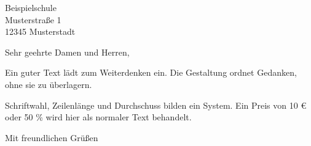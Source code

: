 \documentclass[12pt,a4paper,ngerman,DIV=12,BCOR=0mm,oneside]{scrlttr2}
\begin{document}
\RaggedRight
\setlength{\parindent}{0pt}
\setlength{\parskip}{.5\baselineskip}
\begin{letter}{Beispielschule\\
Musterstraße 1\\
12345 Musterstadt}
\opening{Sehr geehrte Damen und Herren,}
Ein guter Text lädt zum Weiterdenken ein. Die Gestaltung ordnet Gedanken, ohne sie zu überlagern.

Schriftwahl, Zeilenlänge und Durchschuss bilden ein System. Ein Preis von 10 € oder 50 \% wird hier als normaler Text behandelt.
\closing{Mit freundlichen Grüßen}
\end{letter}
\end{document}

